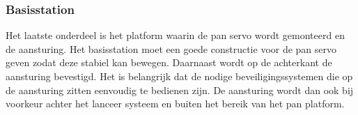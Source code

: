 \subsubsection{Basisstation}

Het laatste onderdeel is het platform waarin de pan servo wordt gemonteerd en de aansturing. Het
basisstation moet een goede constructie voor de pan servo geven zodat deze stabiel
kan bewegen. Daarnaast wordt op de achterkant de aansturing bevestigd. Het is belangrijk dat de
nodige beveiligingssystemen die op de aansturing zitten eenvoudig te bedienen zijn. De aansturing
wordt dan ook bij voorkeur achter het lanceer systeem en buiten het bereik van het pan platform.
